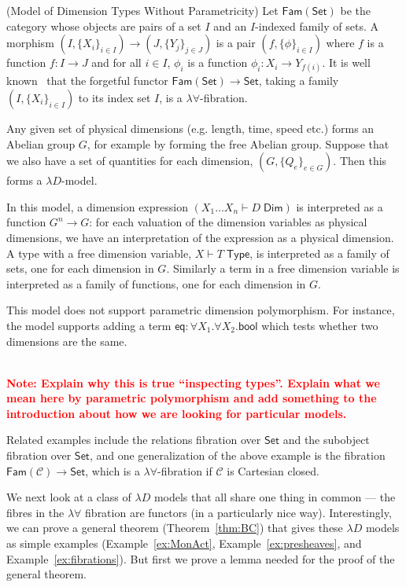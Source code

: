 \documentclass[a4paper,UKenglish]{lipics}
\newcommand\note[1]{{ \bf \textcolor{red} {\vspace{2mm}\; \\ Note: #1\\}}}
\newcommand{\msf}[1]{\mathsf{#1}} %
\newcommand{\Set}{\msf{Set}}
\newcommand{\Fam}[1]{\msf{Fam}(#1)}
\newcommand{\C}{\mathcal{C}}
\newcommand{\bool}{\msf{bool}}
\newcommand{\Tj}[2]{#1 \vdash #2 \; \msf{ Type}}
\newcommand{\Dj}[2]{#1 \vdash #2 \; \msf{ Dim}}
\newcommand{\Dim}{D}
\newcommand{\Dvar}{X}
\begin{document}
\begin{example}(Model of Dimension Types Without Parametricity)
Let $\Fam\Set$ be the category whose objects are pairs of a set $I$ and an $I$-indexed family of sets. A morphism $(I,\{X_i\}_{i\in I})\to (J,\{Y_j\}_{j\in J})$ is a pair $(f,\{\phi\}_{i\in I})$ where $f$ is a function $f:I\to J$ and for all $i\in I$, $\phi_i$ is a function $\phi_i:X_i\to Y_{f(i)}$. It is well known~\cite{} that the forgetful functor $\Fam\Set\to \Set$, taking a family $(I,\{X_i\}_{i\in I})$ to its index set $I$, is a $\lambda\forall$-fibration.

Any given set of physical dimensions (e.g. length, time, speed etc.) forms an Abelian group $G$, for example by forming the free Abelian group. Suppose that we also have a set of quantities for each dimension, $(G,\{Q_e\}_{e\in G})$. Then this forms a $\lambda D$-model.

In this model, a dimension expression $(\Dj{\Dvar_1\dots \Dvar_n} \Dim)$ is interpreted as a function $G^n\to G$: for each valuation of the dimension variables as physical dimensions, we have an interpretation of the expression as a physical dimension. A type with a free dimension variable, $\Tj \Dvar T$, is interpreted as a family of sets, one for each dimension in $G$. Similarly a term in a free dimension variable is interpreted as a family of functions, one for each dimension in $G$.

This model does not support parametric dimension polymorphism. For instance, the model supports adding a term $\mathsf{eq}:\forall \Dvar_1.\forall \Dvar_2.\bool$ which tests whether two dimensions are the same.

\note{Explain why this is true ``inspecting types''. Explain what we mean here by parametric polymorphism and add something to the introduction about how we are looking for particular models.}
\end{example}

Related examples include the relations fibration over $\Set$ and the subobject fibration over $\Set$, and one generalization of the above example is the fibration $\Fam{\C}\to\Set$, which is a $\lambda\forall$-fibration if $\C$ is Cartesian closed.

We next look at a class of $\lambda D$ models that all share one thing in common --- the fibres in the $\lambda \forall$ fibration are functors (in a particularly nice way). Interestingly, we can prove a general theorem (Theorem~\ref{thm:BC}) that gives these $\lambda D$ models as simple examples (Example~\ref{ex:MonAct}, Example~\ref{ex:presheaves}, and Example~\ref{ex:fibrations}). But first we prove a lemma needed for the proof of the general theorem.
\end{document}
